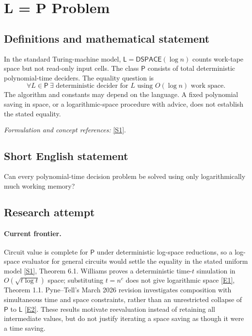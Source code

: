 \documentclass[11pt,a4paper]{article}
\newcommand{\sref}[2]{\hyperlink{source:#1:#2}{[S#2]}}
\newcommand{\eref}[2]{\hyperlink{extra:#1:#2}{[E#2]}}
\newif\ifshowcatalogue
\newcommand{\cataloguescope}[1]{\ifshowcatalogue
 \paragraph{Exact scope in the supplied catalogue.}
 \begin{quote}\small #1\end{quote}\fi}
\numberwithin{equation}{section}
\begin{document}
\setcounter{section}{0}
\clearpage
\section*{\texorpdfstring{L = P Problem}{L = P Problem}}\label{30006702}
\subsection{Definitions and mathematical statement}
In the standard Turing-machine model, $\mathsf L=\mathsf{DSPACE}(\log n)$ counts work-tape space but not read-only input cells. The class $\mathsf P$ consists of total deterministic polynomial-time deciders. The equality question is
\[
 \forall L\in\mathsf P\ \exists\text{ deterministic decider for }L
 \text{ using }O(\log n)\text{ work space}.
\]
The algorithm and constants may depend on the language. A fixed polynomial saving in space, or a logarithmic-space procedure with advice, does not establish the stated equality.
\par\smallskip\textit{Formulation and concept references:} \sref{30006702}{1}.
\cataloguescope{Prove or disprove that every language decidable by a deterministic polynomial-time Turing machine is decidable using O(log n) work space; equivalently, determine whether the complexity classes L and P are equal.}
\subsection{Short English statement}
Can every polynomial-time decision problem be solved using only logarithmically much working memory?
\subsection{Research attempt}

\paragraph{Current frontier.}
Circuit value is complete for $\mathsf P$ under deterministic log-space reductions, so a log-space evaluator for general circuits would settle the equality in the stated uniform model \sref{30006702}{1}, Theorem 6.1. Williams proves a deterministic time-$t$ simulation in $O(\sqrt{t\log t})$ space; substituting $t=n^c$ does not give logarithmic space \eref{30006702}{1}, Theorem 1.1. Pyne--Tell's March 2026 revision investigates composition with simultaneous time and space constraints, rather than an unrestricted collapse of $\mathsf P$ to $\mathsf L$ \eref{30006702}{2}. These results motivate reevaluation instead of retaining all intermediate values, but do not justify iterating a space saving as though it were a time saving.
\end{document}
